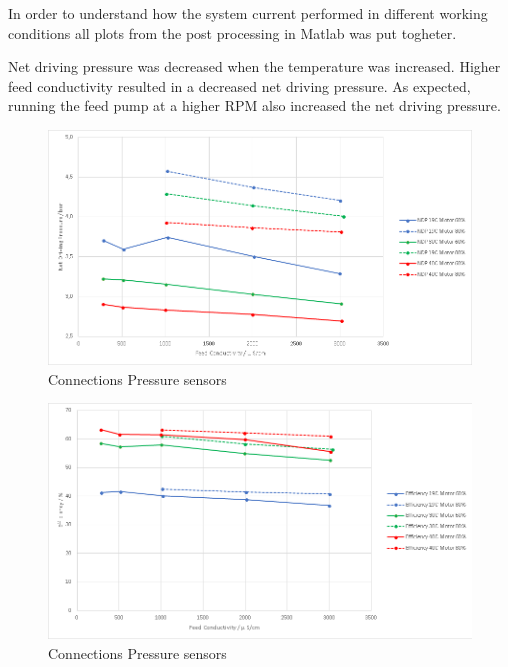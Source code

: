 \newpage

In order to understand how the system current performed in different working conditions all plots from the post processing in Matlab was put togheter. 

Net driving pressure was decreased when the temperature was increased. Higher feed conductivity resulted in a decreased net driving pressure. As expected, running the feed pump at a higher RPM also increased the net driving pressure.



\begin{figure}[H]
    \centering
    \includegraphics[width=1.1\textwidth]{NDP}
    \caption{Connections Pressure sensors}
    \label{fig:PressConn}
\end{figure}


\begin{figure}[H]
    \centering
    \includegraphics[width=1.1\textwidth]{Efficiency}
    \caption{Connections Pressure sensors}
    \label{fig:PressConn}
\end{figure}

